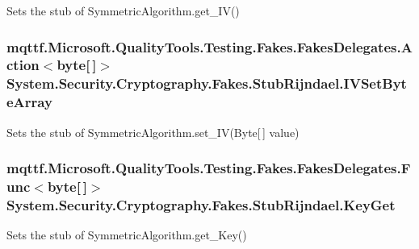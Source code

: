 Sets the stub of Symmetric\-Algorithm.\-get\-\_\-\-I\-V()

\hypertarget{class_system_1_1_security_1_1_cryptography_1_1_fakes_1_1_stub_rijndael_ab5e085b77dee20cb7eb9b0f459f3b726}{
\subsubsection[{I\-V\-Set\-Byte\-Array}]{\setlength{\rightskip}{0pt plus 5cm}mqttf.\-Microsoft.\-Quality\-Tools.\-Testing.\-Fakes.\-Fakes\-Delegates.\-Action$<$byte\mbox{[}$\,$\mbox{]}$>$ System.\-Security.\-Cryptography.\-Fakes.\-Stub\-Rijndael.\-I\-V\-Set\-Byte\-Array}}\label{class_system_1_1_security_1_1_cryptography_1_1_fakes_1_1_stub_rijndael_ab5e085b77dee20cb7eb9b0f459f3b726}


Sets the stub of Symmetric\-Algorithm.\-set\-\_\-\-I\-V(\-Byte\mbox{[}$\,$\mbox{]} value)

\hypertarget{class_system_1_1_security_1_1_cryptography_1_1_fakes_1_1_stub_rijndael_ac77bab7019fe74ee3187dcef6ef0357d}{
\subsubsection[{Key\-Get}]{\setlength{\rightskip}{0pt plus 5cm}mqttf.\-Microsoft.\-Quality\-Tools.\-Testing.\-Fakes.\-Fakes\-Delegates.\-Func$<$byte\mbox{[}$\,$\mbox{]}$>$ System.\-Security.\-Cryptography.\-Fakes.\-Stub\-Rijndael.\-Key\-Get}}\label{class_system_1_1_security_1_1_cryptography_1_1_fakes_1_1_stub_rijndael_ac77bab7019fe74ee3187dcef6ef0357d}


Sets the stub of Symmetric\-Algorithm.\-get\-\_\-\-Key()

